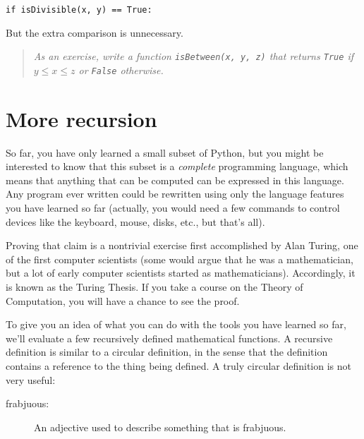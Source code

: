\beforeverb
\begin{verbatim}
if isDivisible(x, y) == True:
\end{verbatim}
\afterverb
%
But the extra comparison is unnecessary.

\begin{quote}
{\em As an exercise, write a function {\tt isBetween(x, y, z)} that
returns {\tt True} if $y \le x \le z$ or {\tt False} otherwise.}
\end{quote}


\section{More recursion}

So far, you have only learned a small subset of Python, but you might
be interested to know that this subset is a {\em complete}
programming language, which means that anything that can be
computed can be expressed in this language.  Any program ever written
could be rewritten using only the language features you have learned
so far (actually, you would need a few commands to control devices
like the keyboard, mouse, disks, etc., but that's all).

Proving that claim is a nontrivial exercise first accomplished by Alan
Turing, one of the first computer scientists (some would argue that he
was a mathematician, but a lot of early computer scientists started as
mathematicians).  Accordingly, it is known as the Turing Thesis.  If
you take a course on the Theory of Computation, you will have a chance
to see the proof.


To give you an idea of what you can do with the tools you have learned
so far, we'll evaluate a few recursively defined mathematical
functions.  A recursive definition is similar to a circular
definition, in the sense that the definition contains a reference to
the thing being defined.  A truly circular definition is not very
useful:

\begin{description}

\item[frabjuous:] An adjective used to describe something that is frabjuous.

\end{description}


